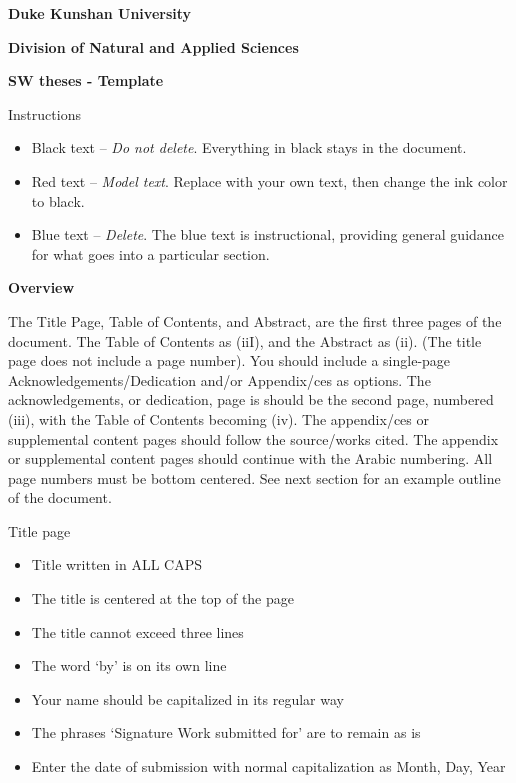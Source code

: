 \documentclass[
]{article}
\author{}
\date{}
\begin{document}
    \textbf{Duke Kunshan University}

    \textbf{Division of Natural and Applied Sciences}

    \textbf{SW theses - Template}

    Instructions

    \begin{itemize}
        \item
        Black text -- \emph{Do not delete}. Everything in black stays in the
        document.
        \item
        Red text -- \emph{Model text}. Replace with your own text, then change
        the ink color to black.
        \item
        Blue text -- \emph{Delete}. The blue text is instructional, providing
        general guidance for what goes into a particular section.
    \end{itemize}

    \textbf{Overview}

    The Title Page, Table of Contents, and Abstract, are the first three
    pages of the document. The Table of Contents as (iiI), and the Abstract
    as (ii). (The title page does not include a page number). You should
    include a single-page Acknowledgements/Dedication and/or Appendix/ces as
    options. The acknowledgements, or dedication, page is should be the
    second page, numbered (iii), with the Table of Contents becoming (iv).
    The appendix/ces or supplemental content pages should follow the
    source/works cited. The appendix or supplemental content pages should
    continue with the Arabic numbering. All page numbers must be bottom
    centered. See next section for an example outline of the document.

    Title page

    \begin{itemize}
        \item
        Title written in ALL CAPS
        \item
        The title is centered at the top of the page
        \item
        The title cannot exceed three lines
        \item
        The word `by' is on its own line
        \item
        Your name should be capitalized in its regular way
        \item
        The phrases `Signature Work submitted for' are to remain as is
        \item
        Enter the date of submission with normal capitalization as Month, Day,
        Year
    \end{itemize}
\end{document}

